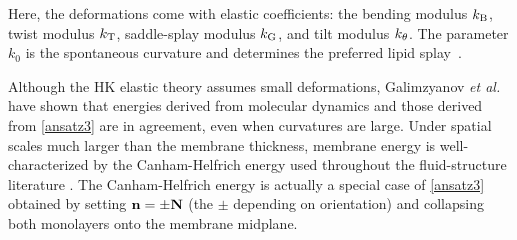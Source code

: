 Here, 
the deformations come with elastic coefficients: the bending modulus
$k_{\mathrm{B}}$, twist modulus $k_{\mathrm{T}}$, saddle-splay modulus $k_{\mathrm{G}}$, and tilt modulus
$k_{\theta}$.
%
The parameter $k_0$ is the spontaneous curvature and determines the
preferred lipid splay~\cite{RoLi15,Kozlov2007}.  

Although the HK elastic theory assumes small deformations, 
Galimzyanov {\em et al.}~\cite{C9SM02079A} have shown that energies derived from
molecular dynamics and those derived from \eqref{ansatz3} are in agreement, even when curvatures are large.
Under spatial scales much larger than the
membrane thickness, membrane energy is well-characterized by the
Canham-Helfrich energy used throughout the fluid-structure literature
\cite{QiangDu09, Lowengrub07,KimLai2010_JCP, Hu, HuLaiSeolEtAl2016_JCP, qua-bir2014, qua-vee-you2019}.
The Canham-Helfrich energy is actually a special case of
\eqref{ansatz3} obtained by setting ${\bf n} =  \pm {\bf N}$ (the $\pm$ depending on
orientation) and collapsing both monolayers onto the membrane midplane.



